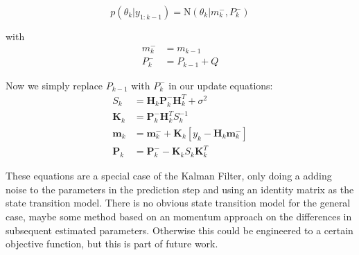 $$ p(\theta_k | y_{1:k-1}) = \text{N}(\theta_k | m_k^{-}, P_k^{-}) $$

with
\begin{align}
  m_k^{-} &= m_{k-1} \\
  P_k^{-} &= P_{k-1} + Q
\end{align}

Now we simply replace $P_{k-1}$ with $P_k^{-}$ in our update equations:
\begin{align*}
     S_k &= \textbf{H}_k \textbf{P}_{k}^{-} \textbf{H}^T_k + \sigma^2 \\
     \textbf{K}_k &= \textbf{P}_{k}^{-} \textbf{H}^T_k S_k^{-1} \\
     \textbf{m}_k &= \textbf{m}_{k}^{-} + \textbf{K}_k [y_k - \textbf{H}_k \textbf{m}_{k}^{-}] \\
     \textbf{P}_k &= \textbf{P}_{k}^{-} - \textbf{K}_k S_k \textbf{K}_k^T
\end{align*}


These equations are a special case of the Kalman Filter, only doing
a adding noise to the parameters in the prediction step and using
an identity matrix as the state transition model. There is no
obvious state transition model for the general case, maybe some
method based on an momentum approach on the differences in subsequent
estimated parameters. Otherwise this could be engineered to a certain
objective function, but this is part of future work.